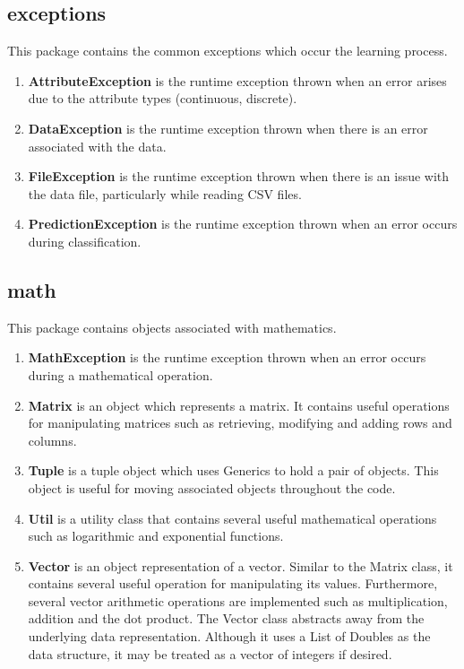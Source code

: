 \documentclass[11pt,titlepage]{article}
\newcommand{\bb}{\textbf}
\begin{document}
\subsection{exceptions}
This package contains the common exceptions which occur the learning process.

\begin{enumerate}[leftmargin=*]
  \item[] \bb{AttributeException} is the runtime exception thrown when an error arises due to the attribute types (continuous, discrete).
  \item[] \bb{DataException} is the runtime exception thrown when there is an error associated with the data.
  \item[] \bb{FileException} is the runtime exception thrown when there is an issue with the data file, particularly while reading CSV files.
  \item[] \bb{PredictionException} is the runtime exception thrown when an error occurs during classification.
\end{enumerate}

\subsection{math}
This package contains objects associated with mathematics.

\begin{enumerate}[leftmargin=*]
  \item[] \bb{MathException} is the runtime exception thrown when an error occurs during a mathematical operation.
  \item[] \bb{Matrix} is an object which represents a matrix. It contains useful operations for manipulating matrices such as retrieving, modifying and adding rows and columns.
  \item[] \bb{Tuple} is a tuple object which uses Generics to hold a pair of objects. This object is useful for moving associated objects throughout the code.
  \item[] \bb{Util} is a utility class that contains several useful mathematical operations such as logarithmic and exponential functions.
  \item[] \bb{Vector} is an object representation of a vector. Similar to the Matrix class, it contains several useful operation for manipulating its values. Furthermore, several vector arithmetic operations are implemented such as multiplication, addition and the dot product. The Vector class abstracts away from the underlying data representation. Although it uses a List of Doubles as the data structure, it may be treated as a vector of integers if desired.
\end{enumerate}
\end{document}
